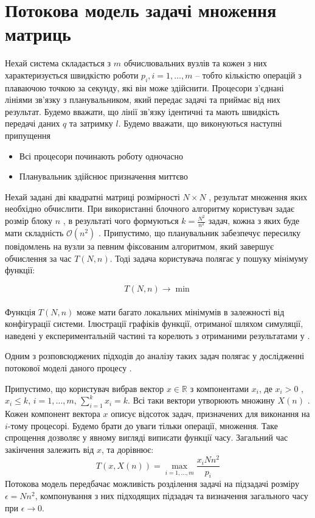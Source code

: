 
\section{Потокова модель задачі множення матриць}

Нехай система складається з $m$ обчислювальних вузлів та кожен з них характеризується швидкістю роботи $p_i , i=1,\ldots,m$ – тобто кількістю операцій з плаваючою точкою за секунду, які він може здійснити. Процесори з’єднані лініями зв’язку з планувальником, який передає задачі та приймає від них результат. Будемо вважати, що лінії зв’язку ідентичні та мають швидкість передачі даних $q$ та затримку $l$.
Будемо вважати, що виконуються наступні припущення
\begin{itemize}
	\item Всі процесори починають роботу одночасно
	\item Планувальник здійснює призначення миттєво
\end{itemize}

Нехай задані дві квадратні матриці розмірності $N \times N$ , результат множення яких необхідно обчислити. При використанні блочного алгоритму користувач задає розмір блоку $n$ , в результаті чого формуються $k=\frac{N^2}{n^2}$  задач, кожна з яких буде мати складність $\mathcal{O}(n^2)$ . Припустимо, що планувальник забезпечує пересилку повідомлень на вузли за певним фіксованим алгоритмом, який завершує обчислення за час $T(N,n)$. Тоді задача користувача полягає у пошуку мінімуму функції:

\begin{equation}
	\label{eq:general_minimization_problem}
	T(N,n) \longrightarrow \min
\end{equation}
\\
Функція $T(N,n)$ може мати багато локальних мінімумів в залежності від конфігурації системи. Ілюстрації графіків функції, отриманої шляхом симуляції, наведені у експериментальній частині та корелють з отриманими результатами у \cite{DoroshenkoIgnatenkoIvanenko}.

Одним з розповсюджених підходів до аналізу таких задач полягає у дослідженні потокової моделі даного процесу \cite{FluidModelForJobScheduling}.

Припустимо, що користувач вибрав вектор $x \in \mathbb{R}$ з компонентами $x_i$, де $x_i > 0$ , $x_i \le k$, $i=1,\ldots,m$, $\sum_{i=1}^{k}x_i = k$. Всі таки вектори утворюють множину $X(n)$ . Кожен компонент вектора $x$ описує відсоток задач, призначених для виконання на  $i$-тому процесорі. Будемо брати до уваги тільки операції, множення. Таке спрощення дозволяє у явному вигляді виписати функції часу. Загальний час закінчення залежить від  $x$, та дорівнює:
\begin{equation}
	\label{eq:total_time_general}
	T(x,X(n)) = \max\limits_{i=1,\ldots,m}{\frac{x_i N n^2}{p_i}}
\end{equation}
Потокова модель передбачає можливість розділення задачі на підзадачі розміру $\epsilon = N n^2$, компонування з них підходящих підзадач та визначення загального часу при  $\epsilon \longrightarrow 0$.


